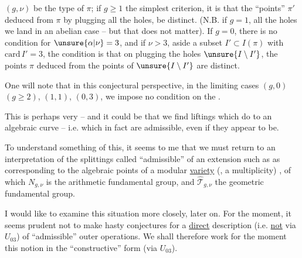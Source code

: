  $(g,\nu)$ be the type of $\pi$;  if $g\geq1$ the simplest criterion, it is that the ``\inserted{$\Gamma^{\natural}$-}points''  $\pi'$ deduced from $\pi$ by plugging all the holes, be distinct.  (N.B. if $g=1$,    all the holes we land in an abelian case -- but that does not matter). If $g=0$,  there is no condition for $\unsure{\alpha|\nu}=3$, and if $\nu>3$,  aside a  subset $I'\subset I(\pi)$ with $\mathrm{card}\,I'=3$, the condition is that on plugging the holes  $\unsure{I\setminus I'}$, the \inserted{$\Gamma^{\natural}$-}points  $\pi$ deduced from the points of $\unsure{I\setminus I'}$ are distinct.

One will note that in this conjectural perspective, in the limiting cases $(g,0)$ $(g\geq2)$, $(1,1)$, $(0,3)$, we impose no condition  on the .



This is perhaps very  -- and it could be that we find liftings which do   to an algebraic curve -- i.e. which in fact are  admissible, even if they appear to be.

To understand something of this, it seems to me that we must return to an interpretation of the  splittings called ``admissible'' of an extension such as
as corresponding to the algebraic points of a modular \uline{variety} (, a multiplicity) , of which $N_{g,\nu}$ is the arithmetic fundamental group, and $\widehat{\mathcal T}_{g,\nu}$ the geometric fundamental group.

I would like to examine this situation more closely, later on. For the moment, it seems prudent not to make  hasty conjectures for  a \uline{direct} description (i.e. \uline{not} via $U_{03}$) of ``admissible'' outer operations. We shall therefore work for the moment  this notion in the ``constructive'' form (via $U_{03}$).

